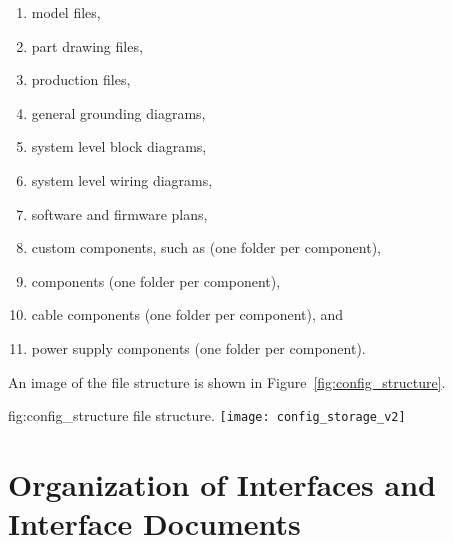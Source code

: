 \begin{enumerate}
 \begin{enumerate}
   \item \threed model files,
   \item \twod part drawing files,
   \item production files,
   \item general grounding diagrams,
   \item system level block diagrams,
   \item system level wiring diagrams,
   \item software and firmware plans,
   \item custom components, such as  (one folder per component),
   \item {} components (one folder per component),
   \item cable components (one folder per component), and 
   \item power supply components (one folder per component).
 \end{enumerate}

\end{enumerate}

An image of the  file structure is shown in
Figure~\ref{fig:config_structure}.
\begin{dunefigure}{fig:config_structure}
  { file structure.}
  \texttt{[image: config\_storage\_v2]}
\end{dunefigure}

\section{Organization of Interfaces and Interface Documents}
\label{sec:fdsp-coord-integ-interface}

